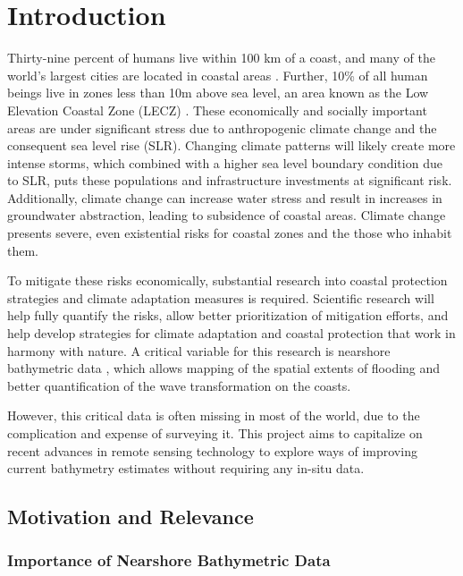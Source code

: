 \chapter{Introduction}


Thirty-nine percent  of humans live within 100 km of a coast, and many of the world's largest cities are located in coastal areas \parencite{Magdalena2021}. Further, 10\% of all human beings live in zones less than 10m above sea level, an area known as the Low Elevation Coastal Zone (LECZ) \parencite{Neumann2015,Lichter2011}. These economically and socially important areas are under significant stress due to anthropogenic climate change and the consequent sea level rise (SLR). Changing climate patterns will likely create more intense storms, which combined with a higher sea level boundary condition due to SLR, puts these populations and infrastructure investments at significant risk. Additionally, climate change can increase water stress and result in increases in groundwater abstraction, leading to subsidence of coastal areas. Climate change presents severe, even existential risks for coastal zones and the those who inhabit them.

To mitigate these risks economically, substantial research into coastal protection strategies and climate adaptation measures is required. Scientific research will help fully quantify the risks, allow better prioritization of mitigation efforts, and help develop strategies for climate adaptation and coastal protection that work in harmony with nature. A critical variable for this research is nearshore bathymetric data \parencite{Holman2013}, which allows mapping of the spatial extents of flooding and better quantification of the wave transformation on the coasts. 

However, this critical data is often missing in most of the world, due to the complication and expense of surveying it. This project aims to capitalize on recent advances in remote sensing technology to explore ways of improving current bathymetry estimates without requiring any in-situ data. 

\section{Motivation and Relevance}
\subsection{Importance of Nearshore Bathymetric Data}

